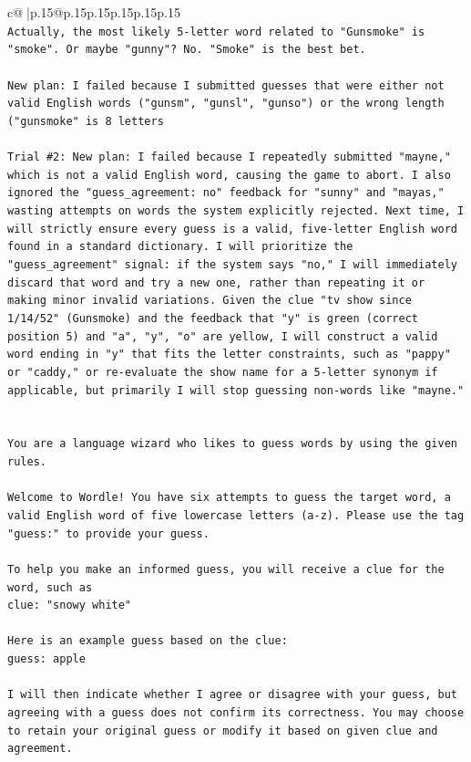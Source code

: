 \documentclass{article}
\begin{document}
{\begin{supertabular}{c@{$\;$}|p{.15\linewidth}@{}p{.15\linewidth}p{.15\linewidth}p{.15\linewidth}p{.15\linewidth}p{.15\linewidth}}
{{{\\ 
\texttt{Actually, the most likely 5{-}letter word related to "Gunsmoke" is "smoke". Or maybe "gunny"? No. "Smoke" is the best bet.} \\
\\ 
\texttt{New plan: I failed because I submitted guesses that were either not valid English words ("gunsm", "gunsl", "gunso") or the wrong length ("gunsmoke" is 8 letters} \\
\\ 
\texttt{Trial \#2: New plan: I failed because I repeatedly submitted "mayne," which is not a valid English word, causing the game to abort. I also ignored the "guess\_agreement: no" feedback for "sunny" and "mayas," wasting attempts on words the system explicitly rejected. Next time, I will strictly ensure every guess is a valid, five{-}letter English word found in a standard dictionary. I will prioritize the "guess\_agreement" signal: if the system says "no," I will immediately discard that word and try a new one, rather than repeating it or making minor invalid variations. Given the clue "tv show since 1/14/52" (Gunsmoke) and the feedback that "y" is green (correct position 5) and "a", "y", "o" are yellow, I will construct a valid word ending in "y" that fits the letter constraints, such as "pappy" or "caddy," or re{-}evaluate the show name for a 5{-}letter synonym if applicable, but primarily I will stop guessing non{-}words like "mayne."} \\
\\ 
\\ 
\texttt{You are a language wizard who likes to guess words by using the given rules.} \\
\\ 
\texttt{Welcome to Wordle! You have six attempts to guess the target word, a valid English word of five lowercase letters (a{-}z). Please use the tag "guess:" to provide your guess.} \\
\\ 
\texttt{To help you make an informed guess, you will receive a clue for the word, such as} \\
\texttt{clue: "snowy white"} \\
\\ 
\texttt{Here is an example guess based on the clue: } \\
\texttt{guess: apple} \\
\\ 
\texttt{I will then indicate whether I agree or disagree with your guess, but agreeing with a guess does not confirm its correctness. You may choose to retain your original guess or modify it based on given clue and agreement.} \\
}}}
\end{supertabular}}
\end{document}
